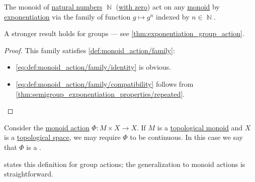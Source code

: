 \begin{proposition}\label{thm:exponentiation_monoid_action}
  The monoid of \hyperref[def:natural_numbers]{natural numbers} \( \BbbN \) (\hyperref[rem:peano_arithmetic_zero]{with zero}) act on any \hyperref[def:monoid]{monoid} by \hyperref[def:monoid/exponentiation]{exponentiation} via the family of function \( g \mapsto g^n \) indexed by \( n \in \BbbN \).
\end{proposition}
\begin{comments}
  \item A stronger result holds for groups --- see \cref{thm:exponentiation_group_action}.
\end{comments}
\begin{proof}
  This family satisfies \cref{def:monoid_action/family}:
  \begin{itemize}
    \item \ref{eq:def:monoid_action/family/identity} is obvious.
    \item \ref{eq:def:monoid_action/family/compatibility} follows from \cref{thm:semigroup_exponentiation_properties/repeated}.
  \end{itemize}
\end{proof}

\begin{definition}\label{def:continuous_monoid_action}
  Consider the \hyperref[def:monoid_action]{monoid action} \( \Phi: M \times X \to X \). If \( M \) is a \hyperref[def:topological_semigroup]{topological monoid} and \( X \) is a \hyperref[def:topological_space]{topological space}, we may require \( \Phi \) to be continuous. In this case we say that \( \Phi \) is a .
\end{definition}
\begin{comments}
  \item {} states this definition for group actions; the generalization to monoid actions is straightforward.
\end{comments}

